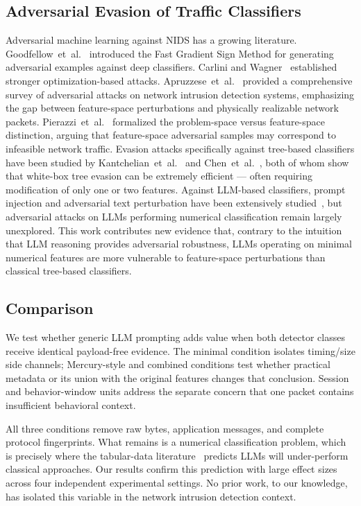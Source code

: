\documentclass[letterpaper,twocolumn,10pt]{article}
\begin{document}
\subsection{Adversarial Evasion of Traffic Classifiers}

Adversarial machine learning against NIDS has a growing literature. Goodfellow~et~al.~\cite{goodfellow2015fgsm} introduced the Fast Gradient Sign Method for generating adversarial examples against deep classifiers. Carlini and Wagner~\cite{carlini2017cw} established stronger optimization-based attacks. Apruzzese~et~al.~\cite{apruzzese2020adversarial} provided a comprehensive survey of adversarial attacks on network intrusion detection systems, emphasizing the gap between feature-space perturbations and physically realizable network packets. Pierazzi~et~al.~\cite{pierazzi2020problem} formalized the problem-space versus feature-space distinction, arguing that feature-space adversarial samples may correspond to infeasible network traffic. Evasion attacks specifically against tree-based classifiers have been studied by Kantchelian~et~al.~\cite{kantchelian2016evasion} and Chen~et~al.~\cite{chen2019robust}, both of whom show that white-box tree evasion can be extremely efficient --- often requiring modification of only one or two features. Against LLM-based classifiers, prompt injection and adversarial text perturbation have been extensively studied~\cite{perez2022prompt,zou2023universal}, but adversarial attacks on LLMs performing numerical classification remain largely unexplored. This work contributes new evidence that, contrary to the intuition that LLM reasoning provides adversarial robustness, LLMs operating on minimal numerical features are more vulnerable to feature-space perturbations than classical tree-based classifiers.

\subsection{Comparison}

We test whether generic LLM prompting adds value when both detector classes receive identical payload-free evidence. The minimal condition isolates timing/size side channels; Mercury-style and combined conditions test whether practical metadata or its union with the original features changes that conclusion. Session and behavior-window units address the separate concern that one packet contains insufficient behavioral context.

All three conditions remove raw bytes, application messages, and complete protocol fingerprints. What remains is a numerical classification problem, which is precisely where the tabular-data literature~\cite{hegselmann2023tabllm,fang2024large, wang2024tabletime} predicts LLMs will under-perform classical approaches. Our results confirm this prediction with large effect sizes across four independent experimental settings. No prior work, to our knowledge, has isolated this variable in the network intrusion detection context.
\end{document}
